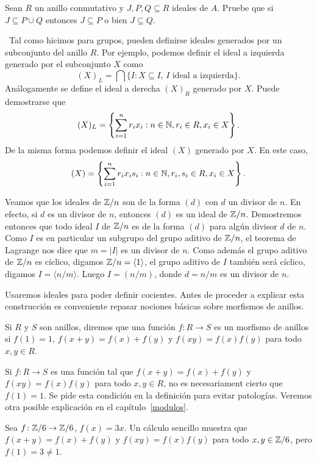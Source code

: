 \begin{exercise}
\label{xca:PcapQ}
    Sean $R$ un anillo conmutativo y $J,P,Q\subseteq R$ ideales de $A$. Pruebe
    que si $J\subseteq P\cup Q$ entonces $J\subseteq P$ o bien $J\subseteq Q$.
\end{exercise}
\
Tal como hicimos para grupos, pueden definirse ideales generados por un subconjunto del anillo $R$. Por ejemplo, 
podemos definir el ideal a izquierda generado por el subconjunto $X$ como
\[
(X)_L = \bigcap\{I:X\subseteq I,\,I\text{ ideal a izquierda}\}.
\]
Análogamente se define el ideal a derecha $(X)_R$ generado por $X$.  
Puede demostrarse que
\[
(X)_L=\left\{\sum_{i=1}^nr_ix_i:n\in\mathbb{N},r_i\in R,x_i\in X\right\}. 
\]
De la misma forma podemos definir el ideal $(X)$ generado por $X$. En este caso, 
\[
(X) = \left\{\sum_{i=1}^nr_ix_is_i:n\in\mathbb{N},r_i,s_i\in R,x_i\in X\right\}.
\]

\begin{example}
Veamos que los ideales de $\mathbb{Z}/n$ son de la forma $(d)$ con $d$ un divisor de $n$. En efecto, si 
$d$ es un divisor de $n$, entonces $(d)$ es un ideal de $\mathbb{Z}/n$. Demostremos entonces
que todo ideal $I$ de $\mathbb{Z}/n$ es de la forma $(d)$ para algún divisor $d$ de $n$. Como
$I$ es en particular un subgrupo del grupo aditivo de $\mathbb{Z}/n$, el teorema de Lagrange nos dice que 
$m=|I|$ es un divisor de $n$. Como además el grupo
aditivo de $\mathbb{Z}/n$ es cíclico, digamos $\mathbb{Z}/n=\langle 1\rangle$, el grupo aditivo de $I$ también será cíclico, digamos
$I=\langle n/m\rangle$. Luego $I=(n/m)$, donde $d=n/m$ es un divisor de $n$.  
\end{example}

Usaremos ideales para poder definir cocientes. 
Antes de proceder a explicar esta construcción es 
conveniente repasar nociones básicas sobre morfismos de anillos. 

\begin{definition}
Si $R$ y $S$ son anillos, diremos que una función $f\colon R\to S$ es un morfismo de anillos si $f(1)=1$, 
$f(x+y)=f(x)+f(y)$ y $f(xy)=f(x)f(y)$ para todo $x,y\in R$. 	
\end{definition}

Si $f\colon R\to S$ es una función tal que $f(x+y)=f(x)+f(y)$ y $f(xy)=f(x)f(y)$ para todo $x,y\in R$, 
no es necesariament cierto que $f(1)=1$. Se pide esta condición en la definición para evitar patologías. Veremos 
otra posible explicación en el capítulo~\ref{modulos}.

\begin{example}
Sea $f\colon\mathbb{Z}/6\to\mathbb{Z}/6$, $f(x)=3x$. Un cálculo sencillo muestra que $f(x+y)=f(x)+f(y)$ y 
$f(xy)=f(x)f(y)$ para todo $x,y\in\mathbb{Z}/6$, pero $f(1)=3\ne 1$.	
\end{example}

